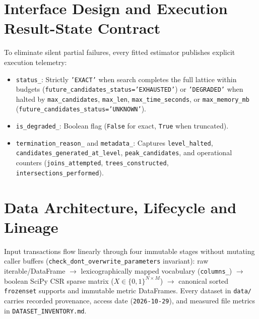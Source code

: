 \section{Interface Design and Execution Result-State Contract}
To eliminate silent partial failures, every fitted estimator publishes explicit execution telemetry:
\begin{itemize}
  \item \texttt{status\_\protect\allowbreak{}}: Strictly \texttt{'EXACT'} when search completes the full lattice within budgets (\texttt{future\_\protect\allowbreak{}candidates\_\protect\allowbreak{}status='EXHAUSTED'}) or \texttt{'DEGRADED'} when halted by \texttt{max\_\protect\allowbreak{}candidates}, \texttt{max\_\protect\allowbreak{}len}, \texttt{max\_\protect\allowbreak{}time\_\protect\allowbreak{}seconds}, or \texttt{max\_\protect\allowbreak{}memory\_\protect\allowbreak{}mb} (\texttt{future\_\protect\allowbreak{}candidates\_\protect\allowbreak{}status='UNKNOWN'}).
  \item \texttt{is\_\protect\allowbreak{}degraded\_\protect\allowbreak{}}: Boolean flag (\texttt{False} for exact, \texttt{True} when truncated).
  \item \texttt{termination\_\protect\allowbreak{}reason\_\protect\allowbreak{}} and \texttt{metadata\_\protect\allowbreak{}}: Captures \texttt{level\_\protect\allowbreak{}halted}, \texttt{candidates\_\protect\allowbreak{}generated\_\protect\allowbreak{}at\_\protect\allowbreak{}level}, \texttt{peak\_\protect\allowbreak{}candidates}, and operational counters (\texttt{joins\_\protect\allowbreak{}attempted}, \texttt{trees\_\protect\allowbreak{}constructed}, \texttt{intersections\_\protect\allowbreak{}performed}).
\end{itemize}

\section{Data Architecture, Lifecycle and Lineage}
Input transactions flow linearly through four immutable stages without mutating caller buffers (\texttt{check\_\protect\allowbreak{}dont\_\protect\allowbreak{}overwrite\_\protect\allowbreak{}parameters} invariant): raw iterable/DataFrame $\to$ lexicographically mapped vocabulary (\texttt{columns\_\protect\allowbreak{}}) $\to$ boolean SciPy CSR sparse matrix ($X \in \{0,1\}^{N \times M}$) $\to$ canonical sorted \texttt{frozenset} supports and immutable metric DataFrames. Every dataset in \texttt{data/\protect\allowbreak{}} carries recorded provenance, access date (\texttt{2026-10-29}), and measured file metrics in \texttt{DATASET\_\protect\allowbreak{}INVENTORY.md}.

